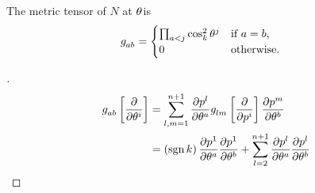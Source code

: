 \documentclass[../main.tex]{subfiles}
\begin{document}
\begin{lemma}\label{M:MetricTensor}
    The metric tensor of $N$ at $\tensor{\theta}{}$is
    \begin{align*}
        \tensor{g}{_a_b} & =
        \begin{cases}
            \prod_{a<j}{\cos_k^2\tensor{\theta}{^j}} & \text{if $a=b$,}  \\
            0                                        & \text{otherwise.} \\
        \end{cases}
    \end{align*}
\end{lemma}
\begin{proof}[]
    \begin{align*}
        \tensor{g}{_a_b}\left[\frac{\partial}{\partial\tensor{\theta}{^i}}\right]
         & = \sum_{l,m=1}^{n+1}{
        \frac{\partial{\tensor{p}{^l}}}{\partial{\tensor{\theta}{^a}}}
        \tensor{g}{_l_m}\left[\frac{\partial}{\partial\tensor{p}{^i}}\right]
        \frac{\partial{\tensor{p}{^m}}}{\partial{\tensor{\theta}{^b}}}
        }                        \\
         & =
        \left(\sign{k}\right)
        \frac{\partial{\tensor{p}{^1}}}{\partial{\tensor{\theta}{^a}}}
        \frac{\partial{\tensor{p}{^1}}}{\partial{\tensor{\theta}{^b}}}
        +
        \sum_{l=2}^{n+1}{
        \frac{\partial{\tensor{p}{^l}}}{\partial{\tensor{\theta}{^a}}}
        \frac{\partial{\tensor{p}{^l}}}{\partial{\tensor{\theta}{^b}}}
        }
    \end{align*}


\end{proof}
\end{document}
